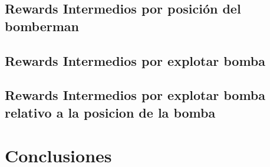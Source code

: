 \documentclass[a4paper,spanish] {article}
\begin{document}
	\subsection{Rewards Intermedios por posici\'on del bomberman}
	\subsection{Rewards Intermedios por explotar bomba}
	\subsection{Rewards Intermedios por explotar bomba relativo a la posicion de la bomba}

\section{Conclusiones}


	





		


		
		

		
		

	 
	
\end{document}
